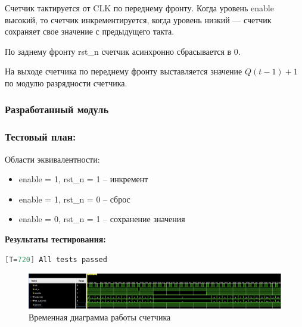\documentclass[12pt,onecolumn]{article}
\begin{document}
Счетчик тактируется от CLK по переднему фронту. Когда уровень enable высокий,
то счетчик инкрементируется, когда уровень низкий — счетчик сохраняет свое
значение с предыдущего такта. 

По заднему фронту rst\_n счетчик асинхронно сбрасывается в 0.

На выходе счетчика по переднему фронту выставляется значение $Q(t-1) + 1$ по модулю разрядности счетчика.
\subsubsection{Разработанный модуль}

\subsubsection{Тестовый план:}
Области эквивалентности:
\begin{itemize}
  \item enable = 1, rst\_n = 1 -- инкремент
  \item enable = 1, rst\_n = 0 -- сброс
  \item enable = 0, rst\_n = 1 -- сохранение значения
\end{itemize}

\textbf{Результаты тестирования:}

\begin{lstlisting}[language=verilog]
  [T=720] All tests passed
\end{lstlisting}

\begin{figure}[H]
  \centering
  \includegraphics[width=\textwidth]{image/counter-diagram.png}
  \caption{Временная диаграмма работы счетчика}
\end{figure}
\end{document}
